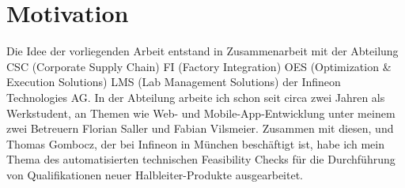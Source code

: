\section{Motivation}
Die Idee der vorliegenden Arbeit entstand in Zusammenarbeit mit der Abteilung CSC (Corporate Supply Chain) FI (Factory Integration) OES (Optimization \& Execution Solutions) LMS (Lab Management Solutions) der Infineon Technologies AG. 
In der Abteilung arbeite ich schon seit circa zwei Jahren als Werkstudent, an Themen wie Web- und Mobile-App-Entwicklung unter meinem zwei Betreuern Florian Saller und Fabian Vilsmeier.
Zusammen mit diesen, und Thomas Gombocz, der bei Infineon in München beschäftigt ist, habe ich mein Thema des automatisierten technischen Feasibility Checks für die Durchführung von Qualifikationen neuer Halbleiter-Produkte ausgearbeitet.